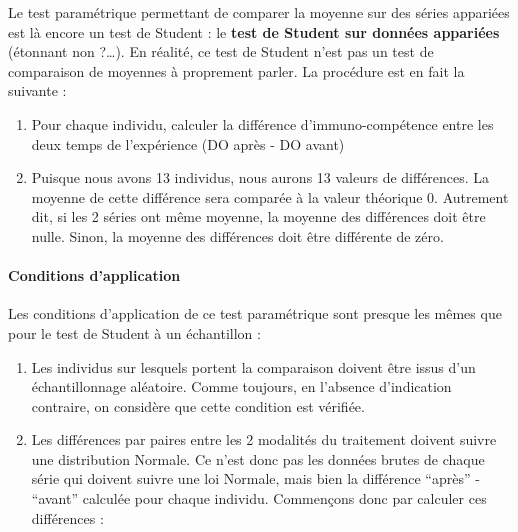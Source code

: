 \documentclass[a4paperpaper,]{article}
\newenvironment{Shaded}{\begin{snugshade}}{\end{snugshade}}
\newcommand{\DataTypeTok}[1]{\textcolor[rgb]{0.00,0.34,0.68}{#1}}
\newcommand{\KeywordTok}[1]{\textcolor[rgb]{0.12,0.11,0.11}{\textbf{#1}}}
\newcommand{\NormalTok}[1]{\textcolor[rgb]{0.12,0.11,0.11}{#1}}
\newcommand{\OperatorTok}[1]{\textcolor[rgb]{0.12,0.11,0.11}{#1}}
\newcommand{\StringTok}[1]{\textcolor[rgb]{0.75,0.01,0.01}{#1}}
\providecommand{\tightlist}{%
  \setlength{\itemsep}{0pt}\setlength{\parskip}{0pt}}
\let\oldparagraph\paragraph
\renewcommand{\paragraph}[1]{\oldparagraph{#1}\mbox{}}
\begin{document}
Le test paramétrique permettant de comparer la moyenne sur des séries appariées est là encore un test de Student : le \textbf{test de Student sur données appariées} (étonnant non ?\ldots{}). En réalité, ce test de Student n'est pas un test de comparaison de moyennes à proprement parler. La procédure est en fait la suivante :

\begin{enumerate}
\def\labelenumi{\arabic{enumi}.}
\tightlist
\item
  Pour chaque individu, calculer la différence d'immuno-compétence entre les deux temps de l'expérience (DO après - DO avant)
\item
  Puisque nous avons 13 individus, nous aurons 13 valeurs de différences. La moyenne de cette différence sera comparée à la valeur théorique 0. Autrement dit, si les 2 séries ont même moyenne, la moyenne des différences doit être nulle. Sinon, la moyenne des différences doit être différente de zéro.
\end{enumerate}

\hypertarget{conditions-dapplication-1}{%
\paragraph{Conditions d'application}\label{conditions-dapplication-1}}

Les conditions d'application de ce test paramétrique sont presque les mêmes que pour le test de Student à un échantillon :

\begin{enumerate}
\def\labelenumi{\arabic{enumi}.}
\tightlist
\item
  Les individus sur lesquels portent la comparaison doivent être issus d'un échantillonnage aléatoire. Comme toujours, en l'absence d'indication contraire, on considère que cette condition est vérifiée.
\item
  Les différences par paires entre les 2 modalités du traitement doivent suivre une distribution Normale. Ce n'est donc pas les données brutes de chaque série qui doivent suivre une loi Normale, mais bien la différence ``après'' - ``avant'' calculée pour chaque individu. Commençons donc par calculer ces différences :
\end{enumerate}

\begin{Shaded}
\end{Shaded}
\end{document}
